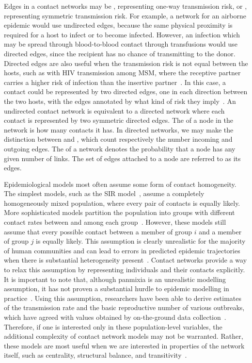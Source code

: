 Edges in a contact networks may be , representing one-way
transmission risk, or , representing symmetric transmission
risk. For example, a network for an airborne epidemic would use undirected
edges, because the same physical proximity is required for a host to infect or
to become infected. However, an infection which may be spread through
blood-to-blood contact through transfusions would use directed edges, since the
recipient has no chance of transmitting to the donor. Directed edges are also
useful when the transmission risk is not equal between the hosts, such as with
\gls{HIV} transmission among \gls{MSM}, where the receptive partner carries a
higher risk of infection than the insertive partner~\autocite{baggaley2010hiv}.
In this case, a contact could be represented by two directed edges, one in each
direction between the two hosts, with the edges annotated by what kind of risk
they imply~\autocite{wasserman1994social}. An undirected contact network is
equivalent to a directed network where each contact is represented by two
symmetric directed edges. The  of a node in the network is how
many contacts it has. In directed networks, we may make the distinction between
 and , which count respectively the number
incoming and outgoing edges. The  of a network
denotes the probability that a node has any given number of links. The set of
edges attached to a node are referred to as its  edges.

Epidemiological models most often assume some form of contact homogeneity. The
simplest models, such as the \gls{SIR} model~\autocite{anderson1992infectious},
assume a completely homogeneously mixed population, where every pair of
contacts is equally likely. More sophisticated models partition the population
into groups with different contact rates between and among each
group~\autocite{jacquez1988modeling}. However, these models still assume that
every possible contact between a member of group $i$ and a member of group $j$
is equally likely. This assumption is clearly unrealistic for the majority of
human communities and can lead to errors in predicted epidemic trajectories
when there is substantial heterogeneity present~\autocite{bansal2007individual,
volz2007susceptible, rolls2015simulation}. Contact networks provide a way to
relax this assumption by representing individuals and their contacts
explicitly. It is important to note that, although panmixia is an unrealistic
modelling assumption, it has not proven a substantial hurdle to epidemic
modelling in practice~\autocite{anderson1992infectious}. Using this assumption,
researchers have been able to derive estimates of the transmission rate and the
basic reproductive number of various outbreaks, which have agreed with values
obtained by on-the-ground data collection~\autocite{stadler2014insights}.
Therefore, if one is interested only in these population-level variables, the
additional complexity of contact network models may not be warranted. Rather,
these models are most useful when we are interested in properties of the
network itself, such as centrality, structural balance, and
transitivity~\autocite{wasserman1994social}.

